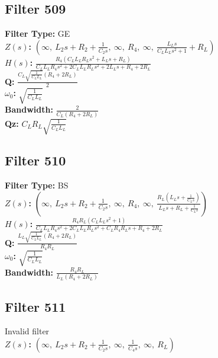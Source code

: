 \documentclass{article}
\begin{document}
\subsection*{Filter 509}
\textbf{Filter Type:} GE \\ 
\textbf{$Z(s)$:} $\left( \infty, \  L_{2} s + R_{2} + \frac{1}{C_{2} s}, \  \infty, \  R_{4}, \  \infty, \  \frac{L_{L} s}{C_{L} L_{L} s^{2} + 1} + R_{L}\right)$ \\ 
\textbf{$H(s)$:} $\frac{R_{4} \left(C_{L} L_{L} R_{L} s^{2} + L_{L} s + R_{L}\right)}{C_{L} L_{L} R_{4} s^{2} + 2 C_{L} L_{L} R_{L} s^{2} + 2 L_{L} s + R_{4} + 2 R_{L}}$ \\ 
\textbf{Q:} $\frac{C_{L} \sqrt{\frac{1}{C_{L} L_{L}}} \left(R_{4} + 2 R_{L}\right)}{2}$ \\ 
\textbf{$\omega_0$:} $\sqrt{\frac{1}{C_{L} L_{L}}}$ \\ 
\textbf{Bandwidth:} $\frac{2}{C_{L} \left(R_{4} + 2 R_{L}\right)}$ \\ 
\textbf{Qz:} $C_{L} R_{L} \sqrt{\frac{1}{C_{L} L_{L}}}$ \\ 
\subsection*{Filter 510}
\textbf{Filter Type:} BS \\ 
\textbf{$Z(s)$:} $\left( \infty, \  L_{2} s + R_{2} + \frac{1}{C_{2} s}, \  \infty, \  R_{4}, \  \infty, \  \frac{R_{L} \left(L_{L} s + \frac{1}{C_{L} s}\right)}{L_{L} s + R_{L} + \frac{1}{C_{L} s}}\right)$ \\ 
\textbf{$H(s)$:} $\frac{R_{4} R_{L} \left(C_{L} L_{L} s^{2} + 1\right)}{C_{L} L_{L} R_{4} s^{2} + 2 C_{L} L_{L} R_{L} s^{2} + C_{L} R_{4} R_{L} s + R_{4} + 2 R_{L}}$ \\ 
\textbf{Q:} $\frac{L_{L} \sqrt{\frac{1}{C_{L} L_{L}}} \left(R_{4} + 2 R_{L}\right)}{R_{4} R_{L}}$ \\ 
\textbf{$\omega_0$:} $\sqrt{\frac{1}{C_{L} L_{L}}}$ \\ 
\textbf{Bandwidth:} $\frac{R_{4} R_{L}}{L_{L} \left(R_{4} + 2 R_{L}\right)}$ \\ 
\subsection*{Filter 511}
Invalid filter \\ 
\textbf{$Z(s)$:} $\left( \infty, \  L_{2} s + R_{2} + \frac{1}{C_{2} s}, \  \infty, \  \frac{1}{C_{4} s}, \  \infty, \  R_{L}\right)$ \\ 
\end{document}
